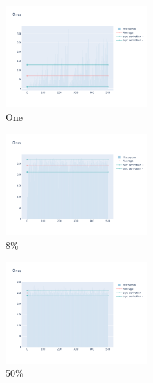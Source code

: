 \documentclass[12pt, fleqn]{report}                             %
\theoremstyle{break}                                            %
\begin{document}
      \begin{figure}[ht!]
        \centering
        \begin{subfigure}[b]{0.4\linewidth}
          \includegraphics[width=0.6\textwidth]{Images/150/dia-a.png}
          \caption{One}
        \end{subfigure}
        \begin{subfigure}[b]{0.4\linewidth}
          \includegraphics[width=0.6\textwidth]{Images/150/dia-b.png}
          \caption{8\%}
        \end{subfigure}
        \begin{subfigure}[b]{0.4\linewidth}
          \includegraphics[width=0.6\textwidth]{Images/150/dia-c.png}
          \caption{50\%}
        \end{subfigure}
        \begin{subfigure}[b]{0.4\linewidth}

\end{subfigure}
\end{figure}
\end{document}
